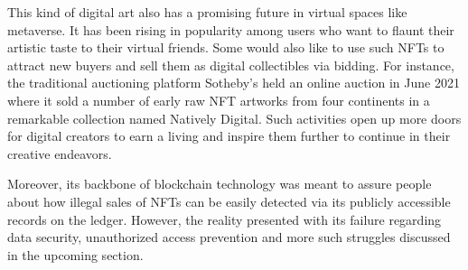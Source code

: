 \documentclass[12pt]{article}
\begin{document}
This kind of digital art also has a promising future in virtual spaces like metaverse. It has been rising in popularity among users who want to flaunt their artistic taste to their virtual friends. Some would also like to use such NFTs to attract new buyers and sell them as digital collectibles via bidding. For instance, the traditional auctioning platform Sotheby’s held an online auction in June 2021 \cite{lambert2021beyond} where it sold a number of early raw NFT artworks from four continents in a remarkable collection named Natively Digital. Such activities open up more doors for digital creators to earn a living and inspire them further to continue in their creative endeavors.

Moreover, its backbone of blockchain technology was meant to assure people about how illegal sales of NFTs can be easily detected via its publicly accessible records on the ledger. However, the reality presented with its failure regarding data security, unauthorized access prevention and more such struggles discussed in the upcoming section. 
\end{document}
